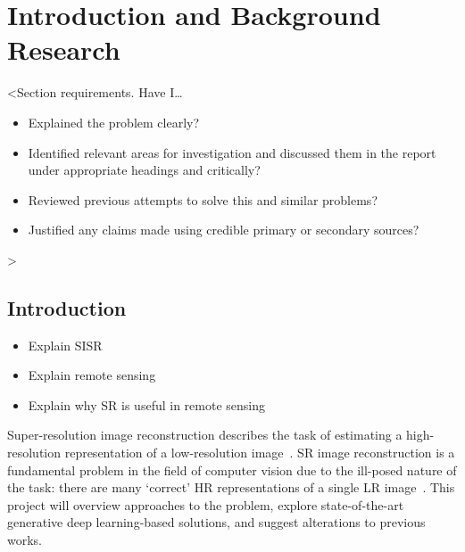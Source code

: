 \chapter{Introduction and Background Research}

\label{chapter1}

<Section requirements. Have I\dots
\begin{itemize}
    \item Explained the problem clearly?
    \item Identified relevant areas for investigation and discussed them in the report under appropriate headings and critically?
    \item Reviewed previous attempts to solve this and similar problems?
    \item Justified any claims made using credible primary or secondary sources?
\end{itemize}
>

\section{Introduction}

\begin{itemize}
    \item Explain SISR
    \item Explain remote sensing
    \item Explain why SR is useful in remote sensing
\end{itemize}

Super-resolution image reconstruction describes the task of estimating a high-resolution representation of a low-resolution image~\cite{superResOverview}. SR image reconstruction is a fundamental problem in the field of computer vision due to the ill-posed nature of the task: there are many `correct' HR representations of a single LR image~\cite{superResChallenges}. This project will overview approaches to the problem, explore state-of-the-art generative deep learning-based solutions, and suggest alterations to previous works.

